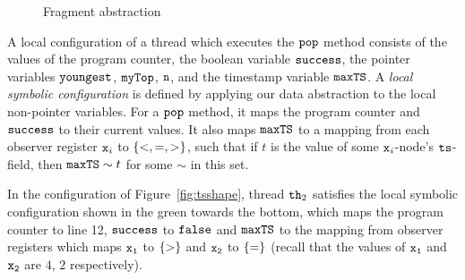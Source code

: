 \begin{figure}
	
\caption{Fragment abstraction}
\label{fig:tsviewshape}
\end{figure} 
A local configuration of a thread which executes the ${\tt pop}$ method consists
of the values of the program counter, the boolean variable ${\tt success}$, the
pointer variables ${\tt youngest}$, ${\tt myTop}$, ${\tt n}$,
and the timestamp variable ${\tt maxTS}$.
A {\em local symbolic configuration} is defined by applying our data abstraction
to the local non-pointer variables.  For a ${\tt pop}$ method, it maps
the program counter and ${\tt success}$ to their current values. It also maps
${\tt maxTS}$ to a mapping from each observer register $\mathtt{x}_i$
to $\left\{<,=,>\right\}$, such that if $t$ is the value of some $\mathtt{x}_i$-node's
$\tt ts$-field, then ${\tt maxTS} \sim t$ for some $\sim$ in this set.

In the configuration of Figure~\ref{fig:tsshape}, thread ${\tt th}_2$
satisfies the local symbolic configuration shown in the green towards the
bottom, 
which maps the program counter to line 12, ${\tt success}$ to ${\tt false}$ and ${\tt maxTS}$ to the mapping from observer registers which maps
$\tt x_1$ to $\left\{>\right\}$ and $\tt x_2$ to $\left\{=\right\}$
(recall that the values of $\tt x_1$ and $\tt x_2$ are $4$, $2$ respectively).



